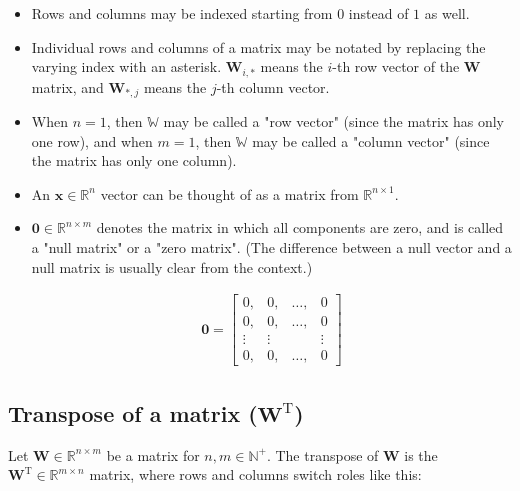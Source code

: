 \documentclass{article}
\begin{document}
        \begin{itemize}
          \item Rows and columns may be indexed starting from $0$ instead of $1$
                as well.

          \item Individual rows and columns of a matrix may be notated by
                replacing the varying index with an asterisk. $\mathbf{W}_{i,*}$
                means the $i$-th row vector of the $\mathbf{W}$ matrix, and
                $\mathbf{W}_{*,j}$ means the $j$-th column vector.

          \item When $n = 1$, then $\mathbb{W}$ may be called a "row vector"
                (since the matrix has only one row), and when $m = 1$, then
                $\mathbb{W}$ may be called a "column vector" (since the matrix
                has only one column).

          \item An $\mathbf{x} \in \mathbb{R}^n$ vector can be thought of as a
                matrix from $\mathbb{R}^{n \times 1}$.

          \item $\mathbf{0} \in \mathbb{R}^{n \times m}$ denotes the matrix in
                which all components are zero, and is called a "null matrix" or
                a "zero matrix". (The difference between a null vector and a
                null matrix is usually clear from the context.)

                \begin{align*}
                  \mathbf{0}
                    = \begin{bmatrix}
                        0, & 0, & \ldots, & 0 \\
                        0, & 0, & \ldots, & 0 \\
                        \vdots & \vdots & & \vdots \\
                        0, & 0, & \ldots, & 0
                      \end{bmatrix}
                \end{align*}
        \end{itemize}

      \subsection{Transpose of a matrix ($\mathbf{W}^\mathrm{T}$)}

        Let $\mathbf{W} \in \mathbb{R}^{n \times m}$ be a matrix for
        $n, m \in \mathbb{N}^+$. The transpose of $\mathbf{W}$ is the
        $\mathbf{W}^\mathrm{T} \in \mathbb{R}^{m \times n}$ matrix, where
        rows and columns switch roles like this:
\end{document}
